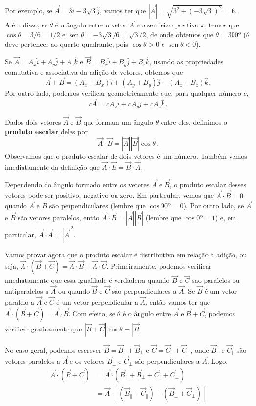 \documentclass[12pt, a4paper]{article}
\DeclareMathOperator{\sen}{sen}
\begin{document}
Por exemplo, se $\vec A=3\hat i-3\sqrt{3}\hat j$, vamos ter que $|\vec A|=\sqrt{3^2+(-3\sqrt{3})^2}=6$. Além disso, se $\theta$ é o ângulo entre o vetor $\vec A$ e o semieixo positivo $x$, temos que $\cos\theta=3/6=1/2$ e $\sen\theta=-3\sqrt{3}/6=\sqrt{3}/2$, de onde obtemos que $\theta=300º$ ($\theta$ deve pertencer ao quarto quadrante, pois $\cos\theta>0$ e $\sen\theta<0$).

Se $\vec A=A_x\hat i+A_y\hat j+A_z\hat k$ e $\vec B=B_x\hat i+B_y\hat j+B_z\hat k$, usando as propriedades comutativa e associativa da adição de vetores, obtemos que
$$\vec A+\vec B=(A_x+B_x)\hat i+(A_y+B_y)\hat j+(A_z+B_z)\hat k\,.$$
Por outro lado, podemos verificar geometricamente que, para qualquer número $c$, 
$$c\vec A=cA_x\hat i+cA_y\hat j+cA_z\hat k\,.$$

Dados dois vetores $\vec A$ e $\vec B$ que formam um ângulo $\theta$ entre eles, definimos o \textbf{produto escalar} deles por
$$\vec A\cdot\vec B=|\vec A||\vec B|\cos\theta\,.$$
Observamos que o produto escalar de dois vetores é um número. Também vemos imediatamente da definição que $\vec A\cdot\vec B=\vec B\cdot\vec A$.

Dependendo do ângulo formado entre os vetores $\vec A$ e $\vec B$, o produto escalar desses vetores pode ser positivo, negativo ou zero. Em particular, vemos que $\vec A\cdot\vec B=0$ quando $\vec A$ e $\vec B$ são perpendiculares (lembre que $\cos 90º=0$). Por outro lado, se $\vec A$ e $\vec B$ são vetores paralelos, então $\vec A\cdot\vec B=|\vec A||\vec B|$ (lembre que $\cos 0º=1$) e, em particular, $\vec A\cdot\vec A=|\vec A|^2$.

Vamos provar agora que o produto escalar é distributivo em relação à adição, ou seja, $\vec A\cdot (\vec B+\vec C)=\vec A\cdot\vec B+\vec A\cdot\vec C$. Primeiramente, podemos verificar imediatamente que essa igualdade é verdadeira quando $\vec B$ e $\vec C$ são paralelos ou antiparalelos a $\vec A$ ou quando $\vec B$ e $\vec C$ são perpendiculares a $\vec A$. Se $\vec B$ é um vetor paralelo a $\vec A$ e $\vec C$ é um vetor perpendicular a $\vec A$, então vamos ter que $\vec A\cdot(\vec B+\vec C)=\vec A\cdot\vec B$. Com efeito, se $\theta$ é o ângulo entre $\vec A$ e $\vec B+\vec C$, podemos verificar graficamente que $|\vec B+\vec C|\cos\theta=|\vec B|$

No caso geral, podemos escrever $\vec B=\vec B_\parallel+\vec B_\perp$ e $\vec C=\vec C_\parallel+\vec C_\perp$, onde $\vec B_\parallel$ e $\vec C_\parallel$ são vetores paralelos a $\vec A$ e os vetores $\vec B_\perp$ e $\vec C_\perp$ são perpendiculares a $\vec A$. Logo,
\begin{equation*}
\begin{split}
\vec A\cdot(\vec B+\vec C)&=\vec A\cdot(\vec B_\parallel+\vec B_\perp+\vec C_\parallel+\vec C_\perp)\\
&=\vec A\cdot[(\vec B_\parallel+\vec C_\parallel)+(\vec B_\perp+\vec C_\perp)]
\end{split}
\end{equation*}
\end{document}
